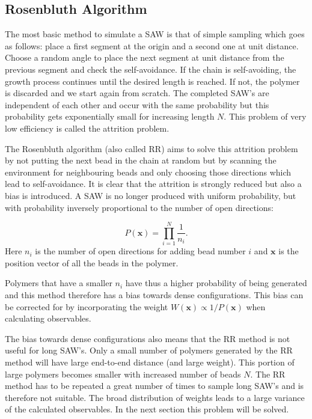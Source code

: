 \subsection*{Rosenbluth Algorithm}

The most basic method to simulate a SAW is that of simple sampling which goes as follows: place a first segment at the origin and a second one at unit distance. Choose a random angle to place the next segment at unit distance from the previous segment and check the self-avoidance. If the chain is self-avoiding, the growth process continues until the desired length is reached. If not, the polymer is discarded and we start again from scratch. The completed SAW's are independent of each other and occur with the same probability but this probability gets exponentially small for increasing length $N$. This problem of very low efficiency is called the attrition problem.

The Rosenbluth algorithm (also called RR) aims to solve this attrition problem by not putting the next bead in the chain at random but by scanning the environment for neighbouring beads and only choosing those directions which lead to self-avoidance. It is clear that the attrition is strongly reduced but also a bias is introduced. A SAW is no longer produced with uniform probability, but with probability inversely proportional to the number of open directions:

\begin{equation} \label{eq:prob_RR}
	P\!\left(\mathbf{x}\right) = \prod_{i=1}^{N} \frac{1}{n_i} .
\end{equation}
Here $n_i$ is the number of open directions for adding bead number $i$ and $\mathbf{x}$ is the position vector of all the beads in the polymer.

Polymers that have a smaller $n_i$ have thus a higher probability of being generated and this method therefore has a bias towards dense configurations. This bias can be corrected for by incorporating the weight $W\!\left( \mathbf{x} \right) \propto 1/ P\!\left( \mathbf{x} \right)$ when calculating observables.

The bias towards dense configurations also means that the RR method is not useful for long SAW's. Only a small number of polymers generated by the RR method will have large end-to-end distance (and large weight). This portion of large polymers becomes smaller with increased number of beads $N$. The RR method has to be repeated a great number of times to sample long SAW's and is therefore not suitable. The broad distribution of weights leads to a large variance of the calculated observables. In the next section this problem will be solved.


